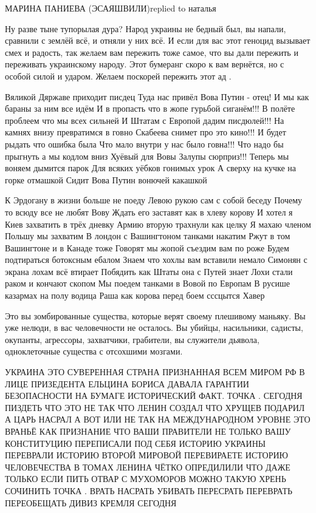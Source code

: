 МАРИНА ПАНИЕВА (ЭСАЯШВИЛИ)replied to наталья

Ну разве тыне тупорылая дура? Народ украины не бедный был, вы напали, сравнили
с землёй всё, и отняли у них всё. И если для вас этот геноцид вызывает смех и
радость, так желаем вам пережить тоже самое, что вы дали пережить и переживать
украинскому народу. Этот бумеранг скоро к вам вернётся, но с особой силой и
ударом. Желаем поскорей пережить этот ад .


Вяликой Дяржаве приходит писдец
Туда нас привёл Вова Путин - отец!
И мы как бараны за ним все идём
И в пропасть что в жопе гурьбой сиганём!!!
В полёте проблеем что мы всех сильней
И Штатам с Европой дадим писдюлей!!!
На камнях внизу превратимся в говно
Скабеева снимет про это кино!!!
И будет рыдать что ошибка была
Что мало внутри у нас было говна!!!
Что надо бы прыгнуть а мы кодлом вниз
Хуёвый для Вовы Залупы сюрприз!!!
Теперь мы воняем дымится парок
Для всяких уёбков гонимых урок
А сверху на кучке на горке отмашкой
Сидит Вова Путин вонючей какашкой

К Эрдогану в жизни больше не поеду
Левою рукою сам с собой беседу
Почему то всюду все не любят Вову
Ждать его заставят как в хлеву корову
И хотел я Киев захватить в трёх дневку
Армию вторую трахнули как целку
Я махаю членом Польшу мы захватим
В лондон с Вашингтоном танками накатим
Ржут в том Вашингтоне и в Канаде тоже
Говорят мы жопой съездим вам по роже
Будем подтираться ботоксным ебалом
Знаем что хохлы вам вставили немало
Симонян с экрана лохам всё втирает
Побядить как Штаты она с Путей знает
Лохи стали раком и кончают скопом
Мы поедем танками в Вовой по Европам
В русише казармах на полу водица
Раша как корова перед боем сссцытся
Хавер

Это вы зомбированные существа, которые верят своему плешивому маньяку. Вы уже
нелюди, в вас человечности не осталось. Вы убийцы, насильники, садисты,
окупанты, агрессоры, захватчики, грабители, вы служители дьявола, одноклеточные
существа с отсохшими мозгами.

УКРАИНА ЭТО СУВЕРЕННАЯ СТРАНА
ПРИЗНАННАЯ ВСЕМ МИРОМ
РФ В ЛИЦЕ ПРИЗЕДЕНТА ЕЛЬЦИНА БОРИСА
ДАВАЛА ГАРАНТИИ БЕЗОПАСНОСТИ НА БУМАГЕ
ИСТОРИЧЕСКИЙ ФАКТ.
ТОЧКА .
СЕГОДНЯ ПИЗДЕТЬ ЧТО ЭТО НЕ ТАК ЧТО ЛЕНИН СОЗДАЛ ЧТО ХРУЩЕВ ПОДАРИЛ А ЦАРЬ НАСРАЛ А ВОТ ИЛИ НЕ ТАК
НА МЕЖДУНАРОДНОМ УРОВНЕ ЭТО ВРАНЬЁ КАК ПРИЗНАНИЕ ЧТО ВАШИ ПРАВИТЕЛИ НЕ ТОЛЬКО ВАШУ КОНСТИТУЦИЮ ПЕРЕПИСАЛИ ПОД СЕБЯ
ИСТОРИЮ УКРАИНЫ ПЕРЕВРАЛИ
ИСТОРИЮ ВТОРОЙ МИРОВОЙ
ПЕРЕВИРАЕТЕ
ИСТОРИЮ ЧЕЛОВЕЧЕСТВА В ТОМАХ ЛЕНИНА ЧЁТКО ОПРЕДИЛИЛИ ЧТО ДАЖЕ ТОЛЬКО ЕСЛИ ПИТЬ ОТВАР С МУХОМОРОВ МОЖНО ТАКУЮ ХРЕНЬ СОЧИНИТЬ
ТОЧКА .
ВРАТЬ
НАСРАТЬ
УБИВАТЬ
ПЕРЕСРАТЬ
ПЕРЕВРАТЬ
ПЕРЕОБЕЩАТЬ
ДИВИЗ КРЕМЛЯ СЕГОДНЯ

